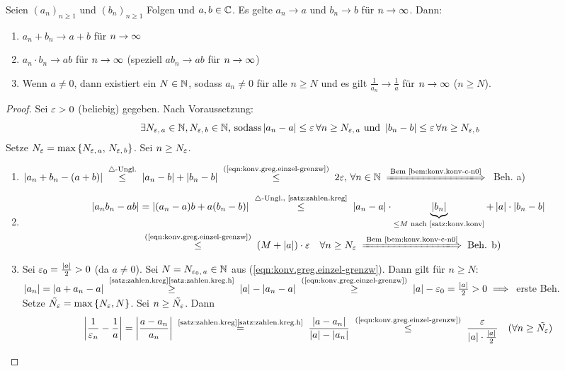 \documentclass[12pt]{scrreprt}
\begin{document}
\begin{satz}
  \label{satz:konv.greg}
  Seien $(a_n)_{n\ge1}$ und $(b_n)_{n\ge1}$ Folgen und $a, b \in
  \mathbb{C}$. Es gelte $a_n \to a$ und $b_n \to b$ für $n\rightarrow\infty$. Dann:
  \begin{enumerate}
  \item $a_n+b_n \to a+b$ für $n\rightarrow\infty$ \label{satz:konv.greg.a}
  \item $a_n \cdot b_n \to ab$ für $n\rightarrow\infty$ (speziell $ab_n \to ab$ für
    $n\rightarrow\infty$)\label{satz:konv.greg.b}
  \item Wenn $a\ne0$, dann existiert ein $N\in\mathbb{N}$, sodass $a_n\ne0$
    für alle $n \ge N$ und es gilt $\frac{1}{a_n}\to\frac{1}{a}$ für
    $n\rightarrow\infty$ ($n\ge N$). \label{satz:konv.greg.c}
  \end{enumerate}
\end{satz}
\begin{proof}
  Sei $\varepsilon>0$ (beliebig) gegeben. Nach Voraussetzung:
  \begin{equation}\label{eqn:konv.greg.einzel-grenzw} \exists
    N_{\varepsilon,\,a}\in\mathbb{N}, N_{\varepsilon,\,b}\in\mathbb{N} \text{, sodass}
    \left\lvert a_n-a\right\lvert\le\varepsilon\,\forall n\ge N_{\varepsilon,\,a} \text{ und }
    \left\lvert b_n-b\right\lvert\le\varepsilon\,\forall n\ge N_{\varepsilon,\,b} \end{equation}
  Setze $N_\varepsilon = \max{\{N_{\varepsilon,\,a},\,N_{\varepsilon,\,b}\}}$. Sei $n\ge N_\varepsilon$.
  \begin{enumerate}
  \item $\abs{a_n+b_n-(a+b)} \nach{\le}{$\triangle$-Ungl.}
    \abs{a_n-b}+\abs{b_n-b}
    \nach{\le}{(\ref{eqn:konv.greg.einzel-grenzw})} 2\ep,\,\forall
    \nat{n} \folgtnach{Bem~\ref{bem:konv.konv-c-n0}}$ Beh. a)
  \item \begin{align*} \abs{a_nb_n-ab} &= \abs{(a_n-a)b+a(b_n-b)}
      \nach{\le}{$\triangle$-Ungl., \ref{satz:zahlen.kreg}}
      \abs{a_n-a}\cdot\underbrace{\abs{b_n}}_{\le M \text{ nach
          \ref{satz:konv.konv}}}+\abs{a}\cdot\abs{b_n-b}\\ 
      &\nach{\le}{(\ref{eqn:konv.greg.einzel-grenzw})}
      (M+\abs{a})\cdot\ep\quad\forall n\ge N_\ep
      \folgtnach{Bem~\ref{bem:konv.konv-c-n0}} \text{Beh. b)}
    \end{align*}
  \item Sei $\varepsilon_0=\frac{\left\lvert a\right\lvert}{2}>0$ (da $a\ne0$). Sei
    $N=N_{\varepsilon_0,\,a}\in\mathbb{N}$ aus
    (\ref{eqn:konv.greg.einzel-grenzw}). Dann gilt für $n\ge N$:
    $\abs{a_n}=\abs{a+a_n-a}
    \nach{\ge}{\ref{satz:zahlen.kreg}\ref{satz:zahlen.kreg.h}}
    \abs{a}-\abs{a_n-a}
    \nach{\ge}{(\ref{eqn:konv.greg.einzel-grenzw})} \abs{a}-\ep_0 =
    \frac{\abs{a}}{2} > 0 \folgt$ erste Beh.\\ 
    Setze $\tilde{N_\varepsilon} = \max{\{N_\varepsilon, N\}}$. Sei
    $n\ge\tilde{N_\varepsilon}$. Dann
    \[\abs{\frac{1}{\ep_n}-\frac{1}{a}} = \abs{\frac{a-a_n}{a_n}}
    \nach{=}{\ref{satz:zahlen.kreg}\ref{satz:zahlen.kreg.h}}
    \frac{\abs{a-a_n}}{\abs{a}-\abs{a_n}}
    \nach{\le}{(\ref{eqn:konv.greg.einzel-grenzw})}
    \frac{\ep}{\abs{a}\cdot\frac{\abs{a}}{2}} \quad(\forall
    n\ge\tilde{N_\ep})\]
  \end{enumerate}
\end{proof}
\end{document}
